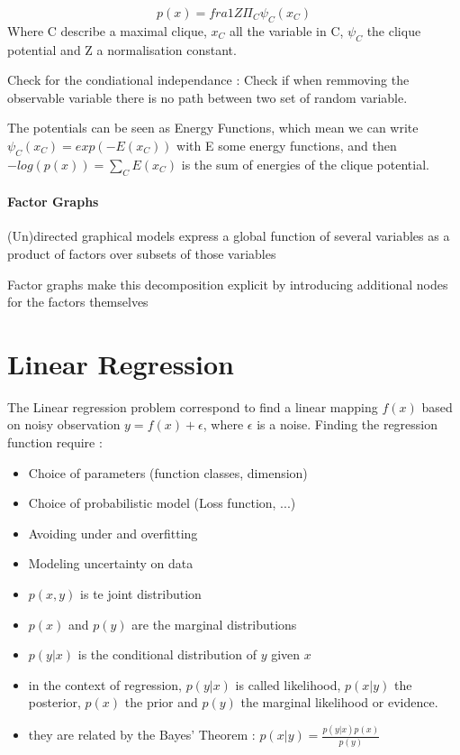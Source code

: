 				\[
					p(x) = fra{1}{Z} \Pi _C \psi _C(x_C)
				\]
				Where C describe a maximal clique, $x_C$ all the variable in C, $\psi_C$ the clique potential and Z a normalisation constant. 

				Check for the condiational independance : Check if when remmoving the observable variable there is no path between two set of random variable.

				The potentials can be seen as Energy Functions, which mean we can write $\psi_C(x_C) = exp(-E(x_C))$ with E some energy functions, and then $-log(p(x)) = \sum_C E(x_C)$ is the sum of energies of the clique potential.



			\paragraph*{Factor Graphs}

				(Un)directed graphical models express a global function of several variables as a product of factors over subsets of those variables

				Factor graphs make this decomposition explicit by introducing additional nodes for the factors themselves


\section{Linear Regression}

	The Linear regression problem correspond to find a linear mapping $f(x)$ based on noisy observation $y = f(x) + \epsilon$, where $\epsilon$ is a noise. 
	Finding the regression function require : 
	\begin{itemize}
		\item Choice of parameters (function classes, dimension)
		\item Choice of probabilistic model (Loss function, ...)
		\item Avoiding under and overfitting
		\item Modeling uncertainty on data
	\end{itemize}

	\begin{definition}
			\begin{itemize}
				\item $p(x, y)$ is te joint distribution
				\item $p(x)$ and $p(y)$ are the marginal distributions
				\item $p(y|x)$ is the conditional distribution of $y$ given $x$
			 	\item in the context of regression, $p(y|x)$ is called likelihood, $p(x|y)$ the posterior, $p(x)$ the prior and $p(y)$ the marginal likelihood or evidence.
			 	\item they are related by the Bayes' Theorem : $p(x|y) = \frac{p(y|x)p(x)}{p(y)}$ 
			\end{itemize}
		\end{definition}

